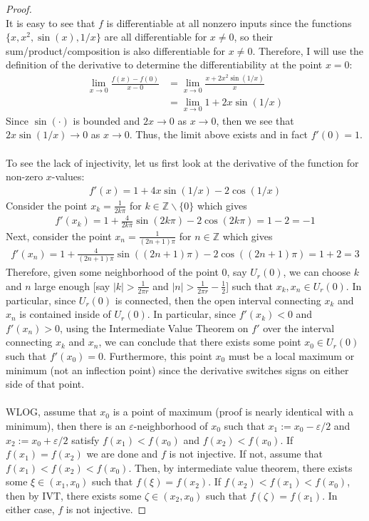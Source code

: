 \documentclass[10pt,a4paper]{article}
\theoremstyle{definition}
\theoremstyle{definition}
\numberwithin{equation}{section}
\begin{document}
\begin{proof}$ $
\\It is easy to see that $f$ is differentiable at all nonzero inputs since the functions $\{x, x^2, \sin(x), 1/x\}$ are all differentiable for $x \neq 0$, so their sum/product/composition is also differentiable for $x \neq 0$. Therefore, I will use the definition of the derivative to determine the differentiability at the point $x = 0$:
\begin{align*}
\lim_{x \to 0} \frac{f(x) - f(0)}{x - 0} &= \lim_{x \to 0} \frac{x + 2x^2 \sin(1/x)}{x}\\
&= \lim_{x \to 0} 1 + 2x \sin(1/x)
\end{align*}
Since $\sin(\cdot)$ is bounded and $2x \to 0$ as $x \to 0$, then we see that $2x\sin(1/x) \to 0$ as $x \to 0$. Thus, the limit above exists and in fact $f'(0) = 1$. 
\\
\\To see the lack of injectivity, let us first look at the derivative of the function for non-zero $x$-values:
\begin{align*}
f'(x) = 1 + 4x\sin(1/x) - 2\cos(1/x)
\end{align*}
Consider the point $x_k = \frac{1}{2k\pi}$ for $k \in \mathbb{Z} \backslash \{0\}$ which gives
\begin{align*}
f'(x_k) = 1 + \frac{4}{2k\pi}\sin(2k\pi) - 2\cos(2k\pi) = 1 - 2 = -1
\end{align*}
Next, consider the point $x_n = \frac{1}{(2n + 1)\pi}$ for $n \in \mathbb{Z}$ which gives
\begin{align*}
f'(x_n) = 1 + \frac{4}{(2n + 1)\pi}\sin((2n + 1)\pi) - 2\cos((2n + 1)\pi) = 1 + 2 = 3
\end{align*}
Therefore, given some neighborhood of the point $0$, say $U_r(0)$, we can choose $k$ and $n$ large enough [say $|k| > \frac{1}{2\pi r}$ and $|n| > \frac{1}{2\pi r} - \frac{1}{2}$] such that $x_k, x_n \in U_r(0)$. In particular, since $U_r(0)$ is connected, then the open interval connecting $x_k$ and $x_n$ is contained inside of $U_r(0)$. In particular, since $f'(x_k) < 0$ and $f'(x_n) > 0$, using the Intermediate Value Theorem on $f'$ over the interval connecting $x_k$ and $x_n$, we can conclude that there exists some point $x_0 \in U_r(0)$ such that $f'(x_0) = 0$. Furthermore, this point $x_0$ must be a local maximum or minimum (not an inflection point) since the derivative switches signs on either side of that point.
\\
\\WLOG, assume that $x_0$ is a point of maximum (proof is nearly identical with a minimum), then there is an $\varepsilon$-neighborhood of $x_0$ such that $x_1 := x_0 - \varepsilon/2$ and $x_2 := x_0 + \varepsilon/2$ satisfy $f(x_1) < f(x_0)$ and $f(x_2) < f(x_0)$. If $f(x_1) = f(x_2)$ we are done and $f$ is not injective. If not, assume that $f(x_1) < f(x_2) < f(x_0)$. Then, by intermediate value theorem, there exists some $\xi \in (x_1, x_0)$ such that $f(\xi) = f(x_2)$. If $f(x_2) < f(x_1) < f(x_0)$, then by IVT, there exists some $\zeta \in (x_2, x_0)$ such that $f(\zeta) = f(x_1)$. In either case, $f$ is not injective. 
\end{proof}
\end{document}
